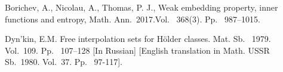 \documentclass[12pt]{llncs}
\begin{document}


\begin{thebibliography}{9} %


Borichev, A., Nicolau, A.,  Thomas, P. J., Weak embedding property, inner functions and entropy,
 Math. Ann.~2017.Vol. ~368(3). Pp.~ 987--1015.
 
Dyn'kin, E.M. Free interpolation sets for H\"{o}lder classes. Mat. Sb.  ~1979. Vol.~109. Pp.~ 107--128  [In Russian]
[English translation in Math. USSR Sb.~1980. Vol.~37. Pp.~ 97-117].




\end{thebibliography}

\end{document}
